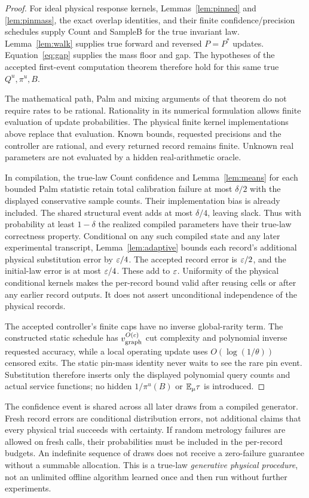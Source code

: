 \begin{proof}
For ideal physical response kernels, Lemmas~\ref{lem:pinned} and
\ref{lem:pinmass}, the exact overlap identities, and their finite
confidence/precision schedules supply Count and SampleB for the true
invariant law. Lemma~\ref{lem:walk} supplies true forward and reversed
$P=P^*$ updates. Equation~\eqref{eq:gap} supplies the mass floor and gap.
The hypotheses of the accepted first-event computation theorem therefore
hold for this same true $Q^u,\pi^u,B$.

The mathematical path, Palm and mixing arguments of that theorem do not
require rates to be rational. Rationality in its numerical formulation
allows finite evaluation of update probabilities. The physical finite
kernel implementations above replace that evaluation. Known bounds,
requested precisions and the controller are rational, and every returned
record remains finite. Unknown real parameters are not evaluated by a
hidden real-arithmetic oracle.

In compilation, the true-law Count confidence and
Lemma~\ref{lem:means} for each bounded Palm statistic retain total
calibration failure at most $\delta/2$ with the displayed conservative
sample counts. Their implementation bias is already included.
The shared structural event adds at most $\delta/4$, leaving slack.
Thus with probability at least $1-\delta$ the realized compiled parameters
have their true-law correctness property. Conditional on any such compiled
state and any later experimental transcript, Lemma~\ref{lem:adaptive}
bounds each record's additional physical substitution error by $\varepsilon/4$.
The accepted record error is $\varepsilon/2$, and the initial-law error is at
most $\varepsilon/4$. These add to $\varepsilon$. Uniformity of the physical conditional
kernels makes the per-record bound valid after reusing cells or after
any earlier record outputs. It does not assert unconditional independence
of the physical records.

The accepted controller's finite caps have no inverse global-rarity term.
The constructed static schedule has $v_{\rm graph}^{O(c)}$ cut complexity
and polynomial inverse requested accuracy, while a local operating update
uses $O(\log(1/\theta))$ censored exits. The static pin-mass identity never
waits to see the rare pin event. Substitution therefore inserts only the
displayed polynomial query counts and actual service functions; no hidden
$1/\pi^u(B)$ or $\mathbb E_\mu\tau$ is introduced.
\end{proof}

The confidence event is shared across all later draws from a compiled
generator. Fresh record errors are conditional distribution errors, not
additional claims that every physical trial succeeds with certainty.
If random metrology failures are allowed on fresh calls, their probabilities
must be included in the per-record budgets. An indefinite sequence of draws
does not receive a zero-failure guarantee without a summable allocation.
This is a true-law \emph{generative physical procedure}, not an unlimited
offline algorithm learned once and then run without further experiments.

